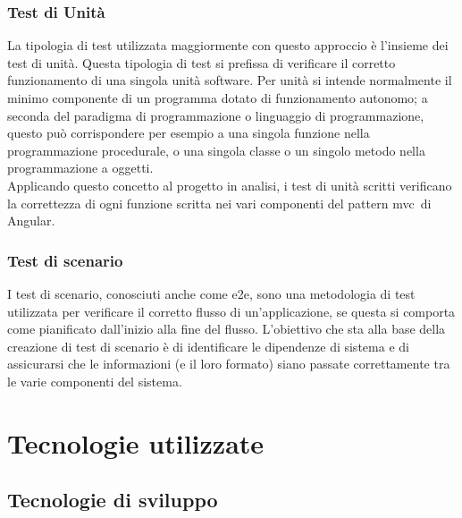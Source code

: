 \subsubsection{Test di Unità}
La tipologia di test utilizzata maggiormente con questo approccio è l'insieme dei test di unità. Questa tipologia di test si prefissa di verificare il corretto funzionamento di una singola unità software. Per unità si intende normalmente il minimo componente di un programma dotato di funzionamento autonomo; a seconda del paradigma di programmazione o linguaggio di programmazione, questo può corrispondere per esempio a una singola funzione nella programmazione procedurale, o una singola classe o un singolo metodo nella programmazione a oggetti.\\
Applicando questo concetto al progetto in analisi, i test di unità scritti verificano la correttezza di ogni funzione scritta nei vari componenti del pattern \gls{mvc}\glsfirstoccur\  di Angular. 

\subsubsection{Test di scenario}
I test di scenario, conosciuti anche come \gls{e2e}, sono una metodologia di test utilizzata per verificare il corretto flusso di un’applicazione, se questa si comporta come pianificato dall’inizio alla fine del flusso. L’obiettivo che sta alla base della creazione di test di scenario è di identificare  le dipendenze di sistema e di assicurarsi che le informazioni (e il loro formato) siano passate correttamente tra le varie componenti del sistema.


\section{Tecnologie utilizzate}
\subsection{Tecnologie di sviluppo}

